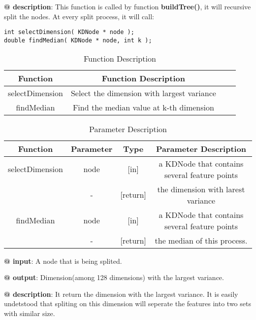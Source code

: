 \documentclass[paper=a4, fontsize=11pt]{scrartcl} %
\numberwithin{equation}{section} %
\numberwithin{figure}{section} %
\numberwithin{table}{section} %
\begin{document}
\textbf{@ description}: This function is called by function \textbf{buildTree()}, it will recursive split the nodes. At every split process, it will call: 

\begin{lstlisting}
int selectDimension( KDNode * node );
double findMedian( KDNode * node, int k );
\end{lstlisting}

\begin{table}[h]
    \centering
    \begin{tabular}{|c|c| lp{}}
        \hline
        \textbf{Function} & \textbf{Function Description} \\\hline
                    selectDimension & Select the dimension with largest variance\\\hline
                    findMedian & Find the median value at k-th dimension\\\hline
    \end{tabular}
    \caption{Function Description}\label{nolock}
\end{table}

\begin{table}[h]
    \centering
    \begin{tabular}{|c|c|c|c|}
        \hline
        \textbf{Function} & \textbf{Parameter} & \textbf{Type} & \textbf{Parameter Description} \\\hline
            selectDimension & node & [in] & a KDNode that contains several feature points \\
                            & - & [return] & the dimension with larest variance \\\hline
            findMedian & node& [in] & a KDNode that contains several feature points \\
            & - & [return] & the median of this process. \\\hline
    \end{tabular}
    \caption{Parameter Description}\label{nolock}
\end{table}

\textbf{@ input}: A node that is being splited.

\textbf{@ output}: Dimension(among 128 dimensions) with the largest variance.

\textbf{@ description}: It return the dimension with the largest variance. It is easily undetstood that spliting on this dimension will seperate the features into two sets with similar size. \\
\end{document}
